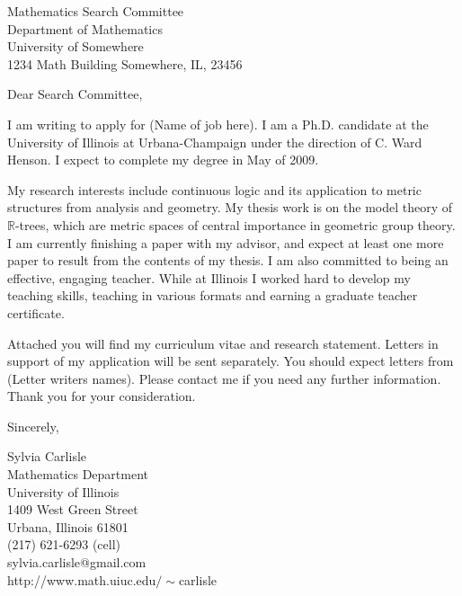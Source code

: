 \documentclass{letter}
\newcommand {\R}{\mathbb{R}}
\begin{document}
\begin{letter}{Mathematics Search Committee\\
Department of Mathematics\\
University of Somewhere\\
1234 Math Building
Somewhere, IL, 23456}


\opening{Dear Search Committee,}
I am writing to apply for (Name of job here).
I am a Ph.D. candidate at the University of Illinois at Urbana-Champaign under
the direction of C. Ward Henson. I expect to complete my degree in May of 2009.

My research interests include continuous logic
and its application to metric structures from analysis and geometry.
My thesis work is on the model theory of $\R$-trees, which are
metric spaces of central importance in geometric group theory.
I am currently finishing a paper 
with my advisor, and
expect at least one more paper to result from the contents of my thesis.
I am also committed to being an effective, engaging teacher.
While at Illinois I worked hard to
develop my teaching skills, teaching in various formats and earning
a graduate teacher certificate. 

Attached you will find my curriculum vitae and research statement.
Letters in support of my application will be sent separately. You should expect
letters from (Letter writers names). Please contact
me if you need any further information. 
Thank you for your consideration.


\closing{Sincerely,
}

Sylvia Carlisle\\
Mathematics Department\\
University of Illinois\\
1409 West Green Street\\
Urbana, Illinois 61801\\
(217) 621-6293 (cell)\\sylvia.carlisle@gmail.com\\
http://www.math.uiuc.edu$/\sim$carlisle
\end{letter}
\end{document}
